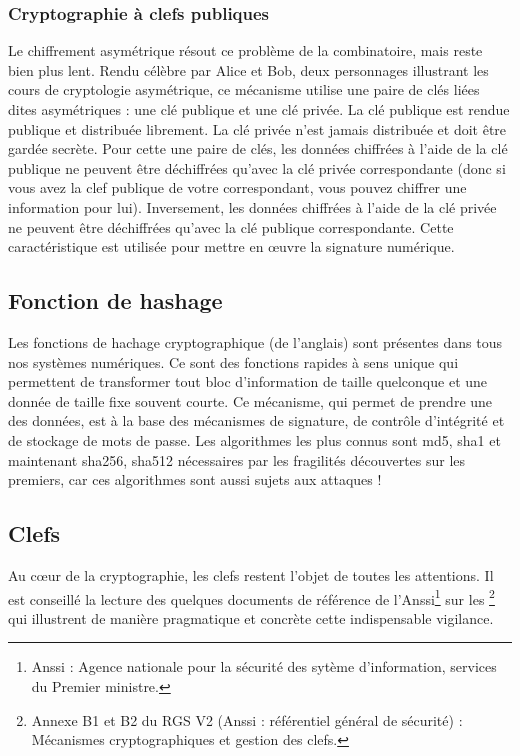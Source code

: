 \subsubsection{Cryptographie à clefs publiques}
Le chiffrement asymétrique résout ce problème de la combinatoire, mais reste bien plus lent. Rendu célèbre par Alice et Bob, deux personnages illustrant les cours de cryptologie asymétrique, ce mécanisme utilise une paire de clés liées dites asymétriques : une clé publique et une clé privée. La clé publique est rendue publique et distribuée librement. La clé privée n'est jamais distribuée et doit être gardée secrète. Pour cette une paire de clés, les données chiffrées à l'aide de la clé publique ne peuvent être déchiffrées qu'avec la clé privée correspondante (donc si vous avez la clef publique de votre correspondant, vous pouvez chiffrer une information pour lui). Inversement, les données chiffrées à l'aide de la clé privée ne peuvent être déchiffrées qu'avec la clé publique correspondante. Cette caractéristique est utilisée pour mettre en œuvre la signature numérique.



\subsection{Fonction de hashage}

Les fonctions de hachage cryptographique (de l'anglais) sont présentes dans tous nos systèmes numériques. Ce sont des fonctions rapides à sens unique qui permettent de transformer tout bloc d'information de taille quelconque et une donnée de taille fixe souvent courte. Ce mécanisme, qui permet de prendre une des données, est à la base des mécanismes de signature, de contrôle d'intégrité et de stockage de mots de passe. Les algorithmes les plus connus sont md5, sha1 et maintenant sha256, sha512 nécessaires par les fragilités découvertes sur les premiers, car ces algorithmes sont aussi sujets aux attaques !

\subsection{Clefs}
Au cœur de la cryptographie, les clefs restent l'objet de toutes les attentions. Il est conseillé la lecture des quelques documents de référence de l'Anssi\footnote{Anssi : Agence nationale pour la sécurité des sytème d'information, services du Premier ministre.} sur les \footnote{Annexe B1 et B2 du RGS V2 (Anssi : référentiel général de sécurité) : Mécanismes cryptographiques et gestion des clefs.} qui illustrent de manière pragmatique et concrète cette indispensable vigilance.
